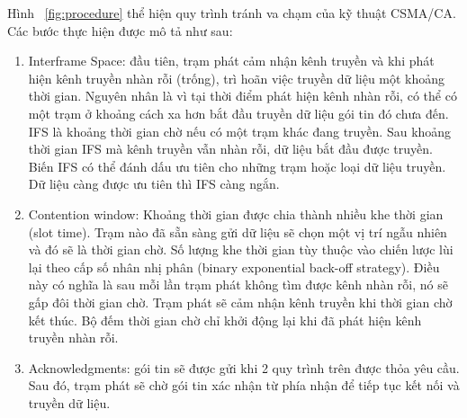 Hình ~\ref{fig:procedure} thể hiện quy trình tránh va chạm của kỹ thuật CSMA/CA. Các bước thực hiện được mô tả như sau:
\begin{enumerate}
    \item Interframe Space: đầu tiên, trạm phát cảm nhận kênh truyền và khi phát hiện kênh truyền nhàn rỗi (trống), trì hoãn việc truyền dữ liệu một khoảng thời gian. Nguyên nhân là vì tại thời điểm phát hiện kênh nhàn rỗi, có thể có một trạm ở khoảng cách xa hơn bắt đầu truyền dữ liệu gói tin đó chưa đến. IFS là khoảng thời gian chờ nếu có một trạm khác đang truyền. Sau khoảng thời gian IFS mà kênh truyền vẫn nhàn rỗi, dữ liệu bắt đầu được truyền. Biến IFS có thể đánh dấu ưu tiên cho những trạm hoặc loại dữ liệu truyền. Dữ liệu càng được ưu tiên thì IFS càng ngắn.
    \item Contention window: Khoảng thời gian được chia thành nhiều khe thời gian (slot time). Trạm nào đã sẵn sàng gửi dữ liệu sẽ chọn một vị trí ngẫu nhiên và đó sẽ là thời gian chờ. Số lượng khe thời gian tùy thuộc vào chiến lược lùi lại theo cấp số nhân nhị phân (binary exponential back-off strategy). Điều này có nghĩa là sau mỗi lần trạm phát không tìm được kênh nhàn rỗi, nó sẽ gấp đôi thời gian chờ. Trạm phát sẽ cảm nhận kênh truyền khi thời gian chờ kết thúc. Bộ đếm thời gian chờ chỉ khởi động lại khi đã phát hiện kênh truyền nhàn rỗi.
    \item Acknowledgments: gói tin sẽ được gửi khi 2 quy trình trên được thỏa yêu cầu. Sau đó, trạm phát sẽ chờ gói tin xác nhận từ phía nhận để tiếp tục kết nối và truyền dữ liệu.
\end{enumerate}
